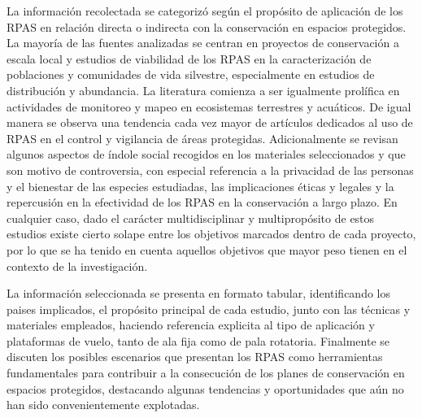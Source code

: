 \documentclass[11pt,]{article}
\begin{document}
La información recolectada se categorizó según el propósito de
aplicación de los RPAS en relación directa o indirecta con la
conservación en espacios protegidos. La mayoría de las fuentes
analizadas se centran en proyectos de conservación a escala local y
estudios de viabilidad de los RPAS en la caracterización de poblaciones
y comunidades de vida silvestre, especialmente en estudios de
distribución y abundancia. La literatura comienza a ser igualmente
prolífica en actividades de monitoreo y mapeo en ecosistemas terrestres
y acuáticos. De igual manera se observa una tendencia cada vez mayor de
artículos dedicados al uso de RPAS en el control y vigilancia de áreas
protegidas. Adicionalmente se revisan algunos aspectos de índole social
recogidos en los materiales seleccionados y que son motivo de
controversia, con especial referencia a la privacidad de las personas y
el bienestar de las especies estudiadas, las implicaciones éticas y
legales y la repercusión en la efectividad de los RPAS en la
conservación a largo plazo. En cualquier caso, dado el carácter
multidisciplinar y multipropósito de estos estudios existe cierto solape
entre los objetivos marcados dentro de cada proyecto, por lo que se ha
tenido en cuenta aquellos objetivos que mayor peso tienen en el contexto
de la investigación.

La información seleccionada se presenta en formato tabular,
identificando los paises implicados, el propósito principal de cada
estudio, junto con las técnicas y materiales empleados, haciendo
referencia explicita al tipo de aplicación y plataformas de vuelo, tanto
de ala fija como de pala rotatoria. Finalmente se discuten los posibles
escenarios que presentan los RPAS como herramientas fundamentales para
contribuir a la consecución de los planes de conservación en espacios
protegidos, destacando algunas tendencias y oportunidades que aún no han
sido convenientemente explotadas.
\end{document}
